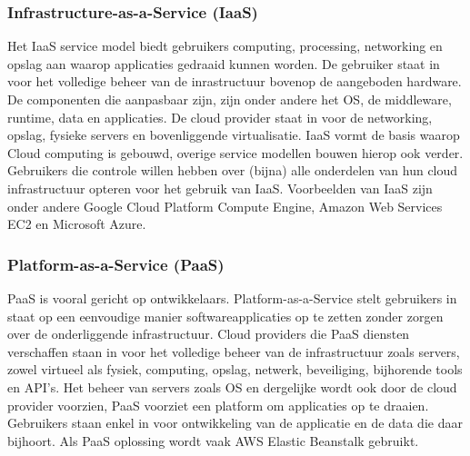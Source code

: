 \subsubsection{Infrastructure-as-a-Service (IaaS)}
Het IaaS service model biedt gebruikers computing, processing, networking en opslag aan waarop applicaties gedraaid kunnen worden. De gebruiker staat in voor het volledige beheer van de inrastructuur bovenop de aangeboden hardware. De componenten die aanpasbaar zijn, zijn onder andere het OS, de middleware, runtime, data en applicaties. De cloud provider staat in voor de networking, opslag, fysieke servers en bovenliggende virtualisatie. IaaS vormt de basis waarop Cloud computing is gebouwd, overige service modellen bouwen hierop ook verder. Gebruikers die controle willen hebben over (bijna) alle onderdelen van hun cloud infrastructuur opteren voor het gebruik van IaaS. Voorbeelden van IaaS zijn onder andere Google Cloud Platform Compute Engine, Amazon Web Services EC2 en Microsoft Azure.

\subsubsection{Platform-as-a-Service (PaaS)}
PaaS is vooral gericht op ontwikkelaars. Platform-as-a-Service stelt gebruikers in staat op een eenvoudige manier softwareapplicaties op te zetten zonder zorgen over de onderliggende infrastructuur. Cloud providers die PaaS diensten verschaffen staan in voor het volledige beheer van de infrastructuur zoals servers, zowel virtueel als fysiek, computing, opslag, netwerk, beveiliging, bijhorende tools en API's. Het beheer van servers zoals OS en dergelijke wordt ook door de cloud provider voorzien, PaaS voorziet een platform om applicaties op te draaien. Gebruikers staan enkel in voor ontwikkeling van de applicatie en de data die daar bijhoort. Als PaaS oplossing wordt vaak AWS Elastic Beanstalk gebruikt.

